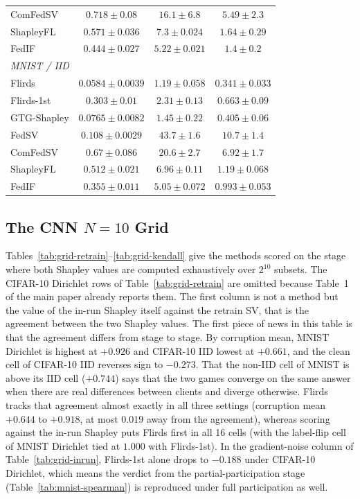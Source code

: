 \documentclass[letterpaper]{article} %
\theoremstyle{plain}
\begin{document}
\begin{table}[t]
\begin{tabular}{lccc}
ComFedSV & $0.718\pm0.08$ & $16.1\pm6.8$ & $5.49\pm2.3$ \\
ShapleyFL & $0.571\pm0.036$ & $7.3\pm0.024$ & $1.64\pm0.29$ \\
FedIF & $0.444\pm0.027$ & $5.22\pm0.021$ & $1.4\pm0.2$ \\
\hline
\multicolumn{4}{l}{\emph{MNIST / IID}} \\
Flirds & $0.0584\pm0.0039$ & $1.19\pm0.058$ & $0.341\pm0.033$ \\
Flirds-1st & $0.303\pm0.01$ & $2.31\pm0.13$ & $0.663\pm0.09$ \\
GTG-Shapley & $0.0765\pm0.0082$ & $1.45\pm0.22$ & $0.405\pm0.06$ \\
FedSV & $0.108\pm0.0029$ & $43.7\pm1.6$ & $10.7\pm1.4$ \\
ComFedSV & $0.67\pm0.086$ & $20.6\pm2.7$ & $6.92\pm1.7$ \\
ShapleyFL & $0.512\pm0.021$ & $6.96\pm0.11$ & $1.19\pm0.068$ \\
FedIF & $0.355\pm0.011$ & $5.05\pm0.072$ & $0.993\pm0.053$ \\
\hline
\end{tabular}
\end{table}

\subsection{The CNN $N{=}10$ Grid}
\label{app:cnn-grid}

Tables~\ref{tab:grid-retrain}--\ref{tab:grid-kendall} give the methods scored
on the stage where both Shapley values are computed exhaustively over $2^{10}$
subsets. The CIFAR-10 Dirichlet rows of Table~\ref{tab:grid-retrain} are
omitted because Table~1 of the main paper already reports them. The first
column is not a method but the value of the in-run Shapley itself against the
retrain SV, that is the agreement between the two Shapley values. The first
piece of news in this table is that the agreement differs from stage to
stage. By corruption mean, MNIST Dirichlet is highest at $+0.926$ and
CIFAR-10 IID lowest at $+0.661$, and the clean cell of CIFAR-10 IID reverses
sign to $-0.273$. That the non-IID cell of MNIST is above its IID cell
($+0.744$) says that the two games converge on the same answer when there
are real differences between clients and diverge otherwise. Flirds tracks
that agreement almost exactly in all three settings (corruption mean $+0.644$
to $+0.918$, at most $0.019$ away from the agreement), whereas scoring
against the in-run Shapley puts Flirds first in all 16 cells (with the
label-flip cell of MNIST Dirichlet tied at $1.000$ with Flirds-1st). In the
gradient-noise column of Table~\ref{tab:grid-inrun}, Flirds-1st alone drops
to $-0.188$ under CIFAR-10 Dirichlet, which means the verdict from the
partial-participation stage (Table~\ref{tab:mnist-spearman}) is reproduced
under full participation as well.
\end{document}
